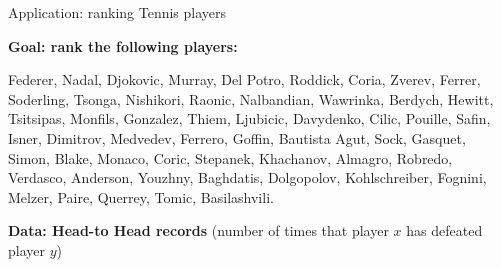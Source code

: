 \documentclass{beamer}
\begin{document}
\begin{frame}[t]{Application: ranking Tennis players}
	\grid

	\vspace{0.5cm}
	\textbf{Goal: rank the following players:}
	\begin{center}
		Federer, Nadal, Djokovic, Murray, Del Potro, Roddick, Coria, Zverev, Ferrer, Soderling, Tsonga, Nishikori, Raonic, Nalbandian, Wawrinka, Berdych, Hewitt, Tsitsipas, Monfils, Gonzalez, Thiem, Ljubicic, Davydenko, Cilic, Pouille, Safin, Isner, Dimitrov, Medvedev, Ferrero, Goffin, Bautista Agut, Sock, Gasquet, Simon, Blake, Monaco, Coric, Stepanek, Khachanov, Almagro, Robredo, Verdasco, Anderson, Youzhny, Baghdatis, Dolgopolov, Kohlschreiber, Fognini, Melzer, Paire, Querrey, Tomic, Basilashvili.
	\end{center}
	\vspace{0.5cm}

	\textbf{Data: Head-to Head records} (number of times that player $x$ has defeated player $y$)

\end{frame}
\end{document}
